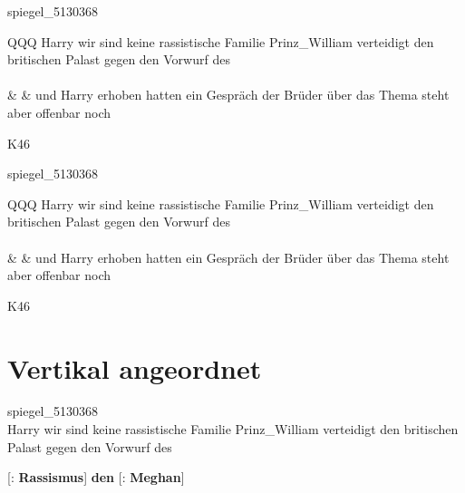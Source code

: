 \begin{table}
spiegel\_5130368
\begin{tabularx}{\textwidth}{QQQ}
Harry wir sind keine rassistische Familie Prinz\_William verteidigt den britischen Palast gegen den Vorwurf des \\
\\
 & & und Harry erhoben hatten ein Gespräch der Brüder über das Thema steht aber offenbar noch \\
\end{tabularx}
K46
\caption{Tabularx mit 3 Spalten, vertikal gegliedert, zentriert}
\end{table}

\begin{table}
spiegel\_5130368
\begin{tabularx}{\textwidth}{QQQ}
Harry wir sind keine rassistische Familie Prinz\_William verteidigt den britischen Palast gegen den Vorwurf des \\
\\
 & & und Harry erhoben hatten ein Gespräch der Brüder über das Thema steht aber offenbar noch \\
\end{tabularx}
K46
\caption{Tabularx mit 3 Spalten, vertikal gegliedert, rechtsbündig}
\end{table}
\clearpage

\section{Vertikal angeordnet}
\ea
spiegel\_5130368\\

Harry wir sind keine rassistische Familie Prinz\_William verteidigt den britischen Palast gegen den Vorwurf des

{[}: \textbf{Rassismus}{]}
\textbf{den}
{[}: \textbf{Meghan}{]}

